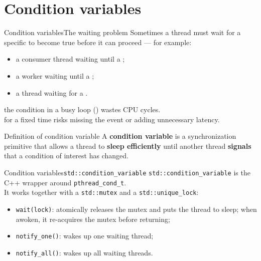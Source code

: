 
\section{Condition variables}
\graphicspath{{figs/section5/}}

\begin{frame}{Condition variables}{The waiting problem}
	\justifying
	Sometimes a thread must wait for a specific  to become true before it can proceed — for example:
	\begin{itemize}
		\item a consumer thread waiting until a ;
		\item a worker waiting until a ;
		\item a thread waiting for a .
	\end{itemize}
	\bigskip
	 the condition in a busy loop () wastes CPU cycles.\\
	 for a fixed time risks missing the event or adding unnecessary latency.\\
	\bigskip
	\begin{block}{Definition of condition variable}
		A \textbf{condition variable} is a synchronization primitive that allows a thread to \textbf{sleep efficiently} until another thread \textbf{signals} that a condition of interest has changed.
	\end{block}
\end{frame}
\begin{frame}{Condition variables}{\texttt{std::condition\_variable}}
	\justifying
	\texttt{std::condition\_variable} is the C++ wrapper around \texttt{pthread\_cond\_t}.\\
	It works together with a \texttt{std::mutex} and a \texttt{std::unique\_lock}:
	\begin{itemize}
		\item \texttt{wait(lock)}: atomically releases the mutex and puts the thread to sleep; when awoken, it re-acquires the mutex before returning;
		\item \texttt{notify\_one()}: wakes up one waiting thread;
		\item \texttt{notify\_all()}: wakes up all waiting threads.
	\end{itemize}
\end{frame}
